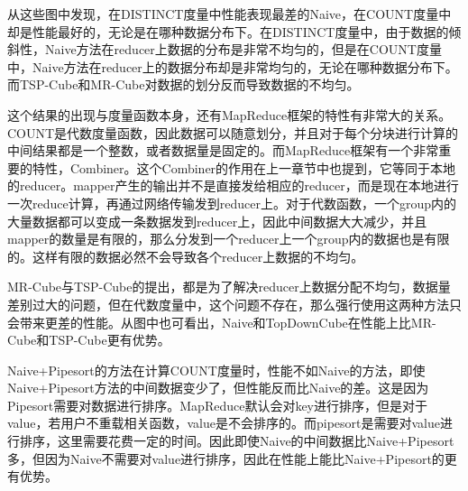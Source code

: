 从这些图中发现，在DISTINCT度量中性能表现最差的Naive，在COUNT度量中却是性能最好的，无论是在哪种数据分布下。在DISTINCT度量中，由于数据的倾斜性，Naive方法在reducer上数据的分布是非常不均匀的，但是在COUNT度量中，Naive方法在reducer上的数据分布却是非常均匀的，无论在哪种数据分布下。而TSP-Cube和MR-Cube对数据的划分反而导致数据的不均匀。

这个结果的出现与度量函数本身，还有MapReduce框架的特性有非常大的关系。COUNT是代数度量函数，因此数据可以随意划分，并且对于每个分块进行计算的中间结果都是一个整数，或者数据量是固定的。而MapReduce框架有一个非常重要的特性，Combiner。这个Combiner的作用在上一章节中也提到，它等同于本地的reducer。mapper产生的输出并不是直接发给相应的reducer，而是现在本地进行一次reduce计算，再通过网络传输发到reducer上。对于代数函数，一个group内的大量数据都可以变成一条数据发到reducer上，因此中间数据大大减少，并且mapper的数量是有限的，那么分发到一个reducer上一个group内的数据也是有限的。这样有限的数据必然不会导致各个reducer上数据的不均匀。

MR-Cube与TSP-Cube的提出，都是为了解决reducer上数据分配不均匀，数据量差别过大的问题，但在代数度量中，这个问题不存在，那么强行使用这两种方法只会带来更差的性能。从图中也可看出，Naive和TopDownCube在性能上比MR-Cube和TSP-Cube更有优势。

Naive+Pipesort的方法在计算COUNT度量时，性能不如Naive的方法，即使Naive+Pipesort方法的中间数据变少了，但性能反而比Naive的差。这是因为Pipesort需要对数据进行排序。MapReduce默认会对key进行排序，但是对于value，若用户不重载相关函数，value是不会排序的。而pipesort是需要对value进行排序，这里需要花费一定的时间。因此即使Naive的中间数据比Naive+Pipesort多，但因为Naive不需要对value进行排序，因此在性能上能比Naive+Pipesort的更有优势。

